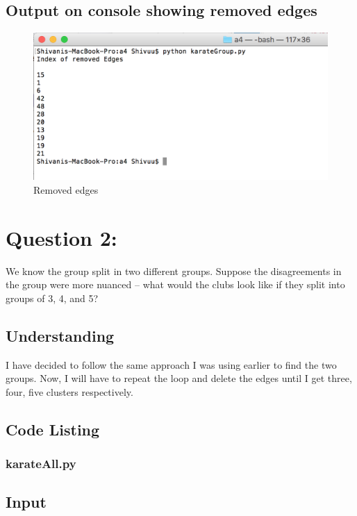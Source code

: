 \documentclass[12pt]{article}
\begin{document}
\subsection{Output on console showing removed edges}
\begin{figure}[ht]
\includegraphics[scale=0.7]{../qn1/screen1.png}
\centering
\caption{Removed edges}
\label{Removed edges}
\end{figure}


\newpage


\newpage




\section{Question 2: }
We know the group split in two different groups.  Suppose the
disagreements in the group were more nuanced -- what would the clubs
look like if they split into groups of 3, 4, and 5?

\subsection{Understanding}
I have decided to follow the same approach I was using earlier to find the two groups. Now, I will have to repeat the loop and delete the edges until I get three, four, five clusters respectively. 

\subsection{Code Listing}
\subsubsection{karateAll.py}

\newpage

\subsection{Input}
\end{document}
